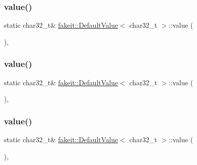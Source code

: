 \subsubsection{\texorpdfstring{value()}{value()}\hspace{0.1cm}{\footnotesize\ttfamily [6/9]}}
{\footnotesize\ttfamily static char32\+\_\+t\& \mbox{\hyperlink{structfakeit_1_1DefaultValue}{fakeit\+::\+Default\+Value}}$<$ char32\+\_\+t $>$\+::value (\begin{DoxyParamCaption}{ }\end{DoxyParamCaption})\hspace{0.3cm}{\ttfamily [inline]}, {\ttfamily [static]}}

\mbox{\label{structfakeit_1_1DefaultValue_3_01char32__t_01_4_ac13a220a319b9ad49e7e5e639b743f85}} 
\subsubsection{\texorpdfstring{value()}{value()}\hspace{0.1cm}{\footnotesize\ttfamily [7/9]}}
{\footnotesize\ttfamily static char32\+\_\+t\& \mbox{\hyperlink{structfakeit_1_1DefaultValue}{fakeit\+::\+Default\+Value}}$<$ char32\+\_\+t $>$\+::value (\begin{DoxyParamCaption}{ }\end{DoxyParamCaption})\hspace{0.3cm}{\ttfamily [inline]}, {\ttfamily [static]}}

\mbox{\label{structfakeit_1_1DefaultValue_3_01char32__t_01_4_ac13a220a319b9ad49e7e5e639b743f85}} 
\subsubsection{\texorpdfstring{value()}{value()}\hspace{0.1cm}{\footnotesize\ttfamily [8/9]}}
{\footnotesize\ttfamily static char32\+\_\+t\& \mbox{\hyperlink{structfakeit_1_1DefaultValue}{fakeit\+::\+Default\+Value}}$<$ char32\+\_\+t $>$\+::value (\begin{DoxyParamCaption}{ }\end{DoxyParamCaption})\hspace{0.3cm}{\ttfamily [inline]}, {\ttfamily [static]}}

